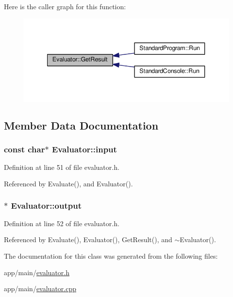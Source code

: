 Here is the caller graph for this function\+:\nopagebreak
\begin{figure}[H]
\begin{center}
\leavevmode
\includegraphics[width=340pt]{classEvaluator_abcc678772175bf00127a3b307463ae4b_icgraph}
\end{center}
\end{figure}




\subsection{Member Data Documentation}
\subsubsection[{\texorpdfstring{input}{input}}]{\setlength{\rightskip}{0pt plus 5cm}const char$\ast$ Evaluator\+::input\hspace{0.3cm}{\ttfamily [private]}}\hypertarget{classEvaluator_a13bf216912227688690b87072bffcd59}{}\label{classEvaluator_a13bf216912227688690b87072bffcd59}


Definition at line 51 of file evaluator.\+h.



Referenced by Evaluate(), and Evaluator().

\subsubsection[{\texorpdfstring{output}{output}}]{$\ast$ Evaluator\+::output\hspace{0.3cm}{\ttfamily [private]}}\hypertarget{classEvaluator_a35018fd9dd13289a6dbf967cd1acd13c}{}\label{classEvaluator_a35018fd9dd13289a6dbf967cd1acd13c}


Definition at line 52 of file evaluator.\+h.



Referenced by Evaluate(), Evaluator(), Get\+Result(), and $\sim$\+Evaluator().



The documentation for this class was generated from the following files\+:\begin{DoxyCompactItemize}
\item 
app/main/\hyperlink{evaluator_8h}{evaluator.\+h}\item 
app/main/\hyperlink{evaluator_8cpp}{evaluator.\+cpp}\end{DoxyCompactItemize}
